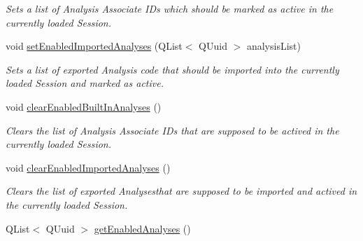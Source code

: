 \begin{DoxyCompactItemize}
\begin{DoxyCompactList}\small\item\em Sets a list of Analysis Associate I\-Ds which should be marked as active in the currently loaded Session. \end{DoxyCompactList}\item 
\hypertarget{class_playback_controller_data_a784a46c9d803fd51b80a503196d19181}{void \hyperlink{class_playback_controller_data_a784a46c9d803fd51b80a503196d19181}{set\-Enabled\-Imported\-Analyses} (Q\-List$<$ Q\-Uuid $>$ analysis\-List)}\label{class_playback_controller_data_a784a46c9d803fd51b80a503196d19181}

\begin{DoxyCompactList}\small\item\em Sets a list of exported Analysis code that should be imported into the currently loaded Session and marked as active. \end{DoxyCompactList}\item 
\hypertarget{class_playback_controller_data_ad00e9ee86011c2d3e339b88aa0e127c5}{void \hyperlink{class_playback_controller_data_ad00e9ee86011c2d3e339b88aa0e127c5}{clear\-Enabled\-Built\-In\-Analyses} ()}\label{class_playback_controller_data_ad00e9ee86011c2d3e339b88aa0e127c5}

\begin{DoxyCompactList}\small\item\em Clears the list of Analysis Associate I\-Ds that are supposed to be actived in the currently loaded Session. \end{DoxyCompactList}\item 
\hypertarget{class_playback_controller_data_a746943b0a08213d9afe13b6e7859a549}{void \hyperlink{class_playback_controller_data_a746943b0a08213d9afe13b6e7859a549}{clear\-Enabled\-Imported\-Analyses} ()}\label{class_playback_controller_data_a746943b0a08213d9afe13b6e7859a549}

\begin{DoxyCompactList}\small\item\em Clears the list of exported Analysesthat are supposed to be imported and actived in the currently loaded Session. \end{DoxyCompactList}\item 
\hypertarget{class_playback_controller_data_af83d29ad76560b6f4928843c3a754fc5}{Q\-List$<$ Q\-Uuid $>$ \hyperlink{class_playback_controller_data_af83d29ad76560b6f4928843c3a754fc5}{get\-Enabled\-Analyses} ()}\label{class_playback_controller_data_af83d29ad76560b6f4928843c3a754fc5}


\end{DoxyCompactItemize}
